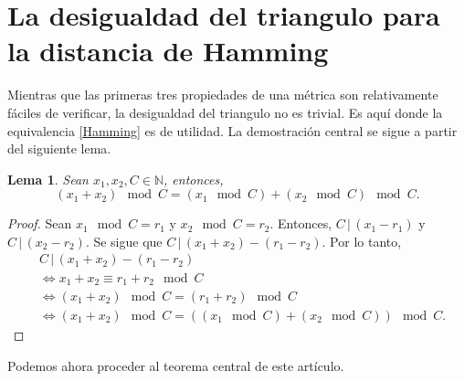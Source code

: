 \documentclass[spanish,twoside]{book}
\newtheorem*{lemma}{Lema}
\begin{document}
\section*{La desigualdad del triangulo para la distancia de Hamming}

Mientras que las primeras tres propiedades de una métrica son relativamente fáciles de verificar, la desigualdad del triangulo no es trivial. Es aquí donde la equivalencia \ref{Hamming} es de utilidad. La demostración central se sigue a partir del siguiente lema. 

\begin{lemma}
		Sean $x_1,x_2,C \in \mathbb{N}$, entonces, 
	\[ (x_1+x_2) \mod C = (x_1 \mod C) + (x_2 \mod C) \mod C. \]
\end{lemma}
\begin{proof}
	Sean $x_1 \mod C = r_1$ y $x_2 \mod C = r_2$. Entonces, $C \, | \, (x_1 - r_1)$ y $C \, | \, (x_2 - r_2)$. Se sigue que $C \, | \, (x_1 + x_2) - (r_1 - r_2)$. Por lo tanto, 
	\begin{align*}
		& C \, | \, (x_1 + x_2) - (r_1 - r_2) \\
		&\iff x_1 + x_2 \equiv r_1 + r_2 \mod C \\
		&\iff (x_1 + x_2) \mod C = (r_1 + r_2) \mod C \\
		&\iff (x_1 + x_2) \mod C = ((x_1 \mod C) + (x_2 \mod C)) \mod C.
	\end{align*}
\end{proof}

Podemos ahora proceder al teorema central de este artículo. 
\end{document}
